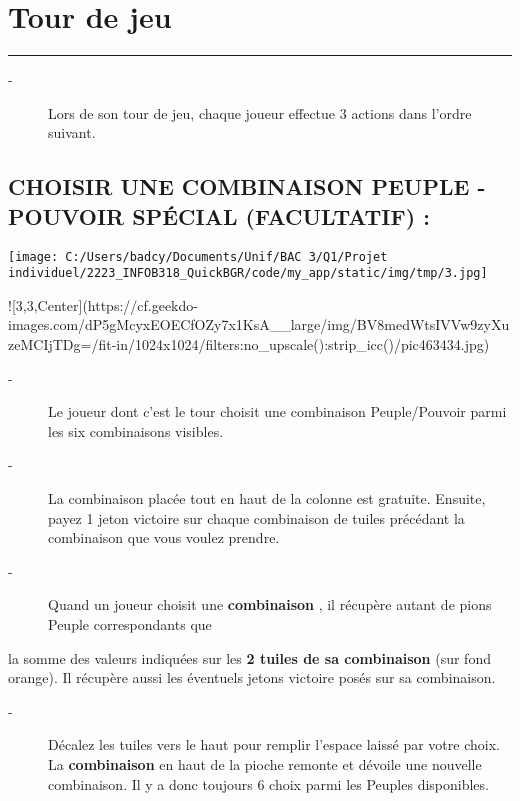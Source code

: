 \documentclass{scrartcl}%
\begin{document}
%
\sectionfont{\color{mygreen}}%
\subsectionfont{\color{mygreen}}%
\subsubsectionfont{\color{mygreen}}%
\section{ Tour de jeu
}%
\label{sec:Tourdejeu}%
\textcolor{mygreen}{\rule{18cm}{0.07cm}}\break%
\begin{description}%
\item[{-} ]%
%
 Lors de son tour de jeu, chaque joueur effectue 3 actions dans l'ordre suivant.
%
\end{description}

%
\subsection{ CHOISIR UNE COMBINAISON PEUPLE {-} POUVOIR SPÉCIAL (FACULTATIF) :
}%
\label{subsec:CHOISIRUNECOMBINAISONPEUPLE{-}POUVOIRSPCIAL(FACULTATIF)}%
%
\begin{center}\texttt{[image: C:/Users/badcy/Documents/Unif/BAC 3/Q1/Projet individuel/2223\_INFOB318\_QuickBGR/code/my\_app/static/img/tmp/3.jpg]}\end{center}%
!{[}3,3,Center{]}(https://cf.geekdo{-}images.com/dP5gMcyxEOECfOZy7x1KsA\_\_large/img/BV8medWtsIVVw9zyXuzeMCIjTDg=/fit{-}in/1024x1024/filters:no\_upscale():strip\_icc()/pic463434.jpg)
%

%
\begin{description}%
\item[{-} ]%
%
 Le joueur dont c'est le tour choisit une combinaison Peuple/Pouvoir parmi les six combinaisons visibles.
%
\item[{-} ]%
%
 La combinaison placée tout en haut de la colonne est gratuite. Ensuite, payez 1 jeton victoire sur chaque combinaison de tuiles précédant la combinaison que vous voulez prendre.
%
\item[{-} ]%
%
 Quand un joueur choisit une %
\textcolor{mygreen}{%
\textbf{combinaison}%
}%
, il récupère autant de pions Peuple correspondants que
%
\end{description}%
la somme des valeurs indiquées sur les %
\textcolor{mygreen}{%
\textbf{2 tuiles de sa combinaison}%
}%
\textit{ }%
 (sur fond orange). Il récupère aussi les éventuels jetons victoire posés sur sa combinaison.
%
\begin{description}%
\item[{-} ]%
%
 Décalez les tuiles vers le haut pour remplir l’espace laissé par votre choix. La %
\textcolor{mygreen}{%
\textbf{combinaison}%
}%
\textit{ }%
 en haut de la pioche remonte et dévoile une nouvelle combinaison. Il y a donc toujours 6 choix parmi les Peuples disponibles.
%
\end{description}
\end{document}
